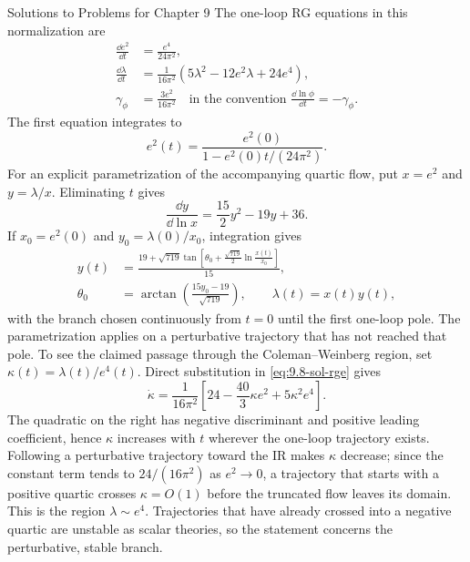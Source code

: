\begin{bankssolutions}{Solutions to Problems for Chapter 9}
The one-loop RG equations in this normalization are
\begin{align}
 \frac{\dd e^2}{\dd t}&=\frac{e^4}{24\pi^2},\\
 \frac{\dd\lambda}{\dd t}&=\frac{1}{16\pi^2}
 \left(5\lambda^2-12e^2\lambda+24e^4\right),\\
 \gamma_\phi&=\frac{3e^2}{16\pi^2}\quad\text{in the convention }
 \frac{\dd\ln\phi}{\dd t}=-\gamma_\phi .
 \label{eq:9.8-sol-rge}
\end{align}
The first equation integrates to
\[
 e^2(t)=\frac{e^2(0)}{1-e^2(0)t/(24\pi^2)}.
\]
For an explicit parametrization of the accompanying quartic flow, put
$x=e^2$ and $y=\lambda/x$.  Eliminating $t$ gives
\[
 \frac{\dd y}{\dd\ln x}=\frac{15}{2}y^2-19y+36.
\]
If $x_0=e^2(0)$ and $y_0=\lambda(0)/x_0$, integration gives
\begin{align*}
 y(t)&=\frac{19+\sqrt{719}\tan\!\left[
 \theta_0+\frac{\sqrt{719}}{2}\ln\frac{x(t)}{x_0}\right]}{15},\\
 \theta_0&=\arctan\!\left(\frac{15y_0-19}{\sqrt{719}}\right),
 \qquad \lambda(t)=x(t)y(t),
\end{align*}
with the branch chosen continuously from $t=0$ until the first one-loop pole.
The parametrization applies on a perturbative trajectory that has not reached
that pole.
To see the claimed passage through the Coleman--Weinberg region, set
$\kappa(t)=\lambda(t)/e^4(t)$.  Direct substitution in
\eqref{eq:9.8-sol-rge} gives
\[
 \dot\kappa=\frac1{16\pi^2}
 \left[24-\frac{40}{3}\kappa e^2+5\kappa^2e^4\right].
\]
The quadratic on the right has negative discriminant and positive leading
coefficient, hence $\kappa$ increases with $t$ wherever the one-loop
trajectory exists.  Following a perturbative trajectory toward the IR makes
$\kappa$ decrease; since the constant term tends to $24/(16\pi^2)$ as
$e^2\to0$, a trajectory that starts with a positive quartic crosses
$\kappa=O(1)$ before the truncated flow leaves its domain.  This is the
region $\lambda\sim e^4$.  Trajectories that have already crossed into a
negative quartic are unstable as scalar theories, so the statement concerns
the perturbative, stable branch.


\end{bankssolutions}
